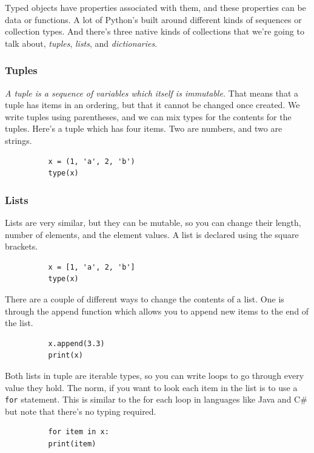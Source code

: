 \documentclass[11pt]{article}
\begin{document}
    Typed objects have properties associated with them, and these
    properties can be data or functions. A lot of Python's built around
    different kinds of sequences or collection types. And there's three
    native kinds of collections that we're going to talk about, {\it
      tuples}, {\it lists}, and {\it dictionaries}.
    
        \subsubsection{Tuples}
        {\it A tuple is a sequence of variables which itself is immutable.}
        That means that a tuple has items in an ordering, but that it cannot
        be changed once created. We write tuples using parentheses, and we can
        mix types for the contents for the tuples. Here's a tuple which has
        four items. Two are numbers, and two are strings.
        \begin{lstlisting}
          x = (1, 'a', 2, 'b')
          type(x)
        \end{lstlisting}
        
        \subsubsection{Lists}
        Lists are very similar, but they can be mutable, so you can
        change their length, number of elements, and the element values. A
        list is declared using the square brackets.
        \begin{lstlisting}
          x = [1, 'a', 2, 'b']
          type(x)
        \end{lstlisting}
        There are a couple of different ways to change the contents of a
        list. One is through the append function which allows you to append
        new items to the end of the list.  
        \begin{lstlisting}
          x.append(3.3)
          print(x)
          \end{lstlisting}
          
        Both lists in tuple are iterable
        types, so you can write loops to go through every value they hold. The
        norm, if you want to look each item in the list is to use a {\tt for} 
        statement. This is similar to the for each loop in languages like Java
        and C\# but note that there's no typing required.
        \begin{lstlisting}
          for item in x:
          print(item)
        \end{lstlisting}
\end{document}

